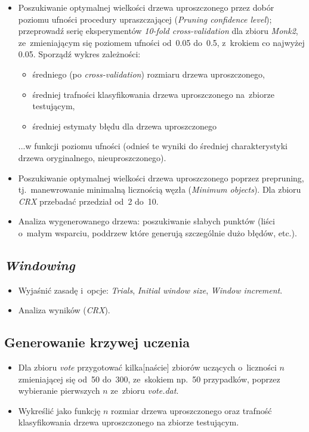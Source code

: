\begin{itemize}
\item Poszukiwanie optymalnej wielkości drzewa uproszczonego przez dobór poziomu ufności procedury upraszczającej (\emph{Pruning confidence level}); przeprowadź serię eksperymentów \emph{10-fold cross-validation} dla zbioru \emph{Monk2}, ze~zmieniającym się poziomem ufności od~0.05 do~0.5, z~krokiem co najwyżej 0.05. Sporządź wykres zależności:

\begin{itemize}
\item średniego (po \emph{cross-validation}) rozmiaru drzewa uproszczonego,
\item średniej trafności klasyfikowania drzewa uproszczonego na~zbiorze testującym,
\item średniej estymaty błędu dla drzewa uproszczonego
\end{itemize}

...w funkcji poziomu ufności (odnieś te wyniki do średniej charakterystyki drzewa oryginalnego, nieuproszczonego).

\item Poszukiwanie optymalnej wielkości drzewa uproszczonego poprzez prepruning, tj.~manewrowanie minimalną licznością węzła (\emph{Minimum objects}). Dla zbioru \emph{CRX} przebadać przedział od~2 do~10.
\item Analiza wygenerowanego drzewa: poszukiwanie słabych punktów (liści o~małym wsparciu, poddrzew które generują szczególnie dużo błędów, etc.).
\end{itemize}

\subsection{\emph{Windowing}}

\begin{itemize}
\item Wyjaśnić zasadę i~opcje: \emph{Trials}, \emph{Initial window size}, \emph{Window increment}.
\item Analiza wyników (\emph{CRX}).
\end{itemize}

\subsection{Generowanie krzywej uczenia}

\begin{itemize}
\item Dla zbioru \emph{vote} przygotować kilka[naście] zbiorów uczących o~liczności $n$ zmieniającej się od~50 do~300, ze~skokiem np.~50 przypadków, poprzez wybieranie pierwszych $n$ ze~zbioru \emph{vote.dat}.
\item Wykreślić jako funkcję $n$ rozmiar drzewa uproszczonego oraz trafność klasyfikowania drzewa uproszczonego na zbiorze testującym.

\end{itemize}

